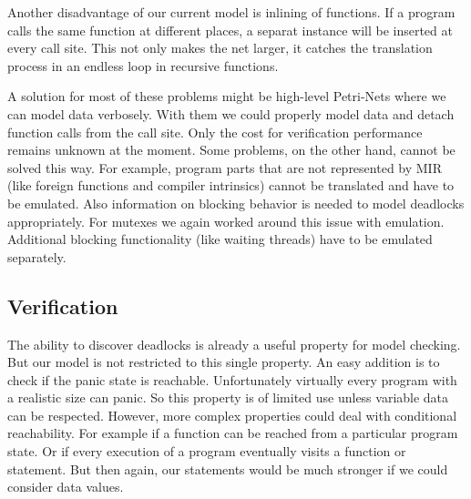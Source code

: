 Another disadvantage of our current model is inlining of functions.
If a program calls the same function at different places, a separat instance will be inserted at every call site.
This not only makes the net larger, it catches the translation process in an endless loop in recursive functions.

A solution for most of these problems might be high-level Petri-Nets where we can model data verbosely.
With them we could properly model data and detach function calls from the call site.
Only the cost for verification performance remains unknown at the moment.
Some problems, on the other hand, cannot be solved this way.
For example, program parts that are not represented by MIR (like foreign functions and compiler intrinsics) cannot be translated and have to be emulated.
Also information on blocking behavior is needed to model deadlocks appropriately.
For mutexes we again worked around this issue with emulation.
Additional blocking functionality (like waiting threads) have to be emulated separately.

\subsection{Verification}
The ability to discover deadlocks is already a useful property for model checking.
But our model is not restricted to this single property.
An easy addition is to check if the panic state is reachable.
Unfortunately virtually every program with a realistic size can panic.
So this property is of limited use unless variable data can be respected.
However, more complex properties could deal with conditional reachability.
For example if a function can be reached from a particular program state.
Or if every execution of a program eventually visits a function or statement.
But then again, our statements would be much stronger if we could consider data values.
